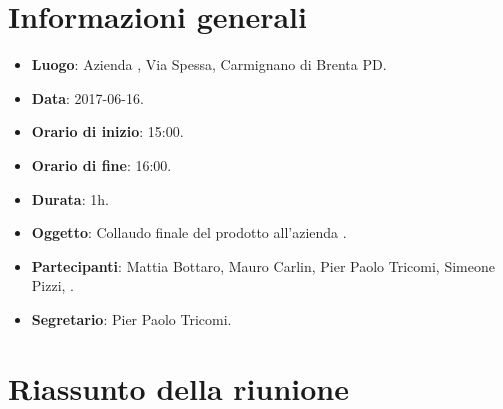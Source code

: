 \documentclass[a4paper,titlepage]{article}
\begin{document}
		
		\maketitle
		\begin{diario}
		\end{diario}
		\newpage
		\tableofcontents
		
		\newpage
		\section{Informazioni generali}
		\label{sec:Informazioni}
		
		\begin{itemize}
			\item \textbf{Luogo}: Azienda \PROPONENTE, Via Spessa, Carmignano di Brenta PD.
			\item \textbf{Data}: 2017-06-16.
			\item \textbf{Orario di inizio}: 15:00.
			\item \textbf{Orario di fine}: 16:00.
			\item \textbf{Durata}: 1h.
			\item \textbf{Oggetto}: Collaudo finale del prodotto \PROGETTO{} all'azienda \PROPONENTE.
			\item \textbf{Partecipanti}: Mattia Bottaro, Mauro Carlin, Pier Paolo Tricomi, Simeone Pizzi, \PROPONENTE.
			\item \textbf{Segretario}: Pier Paolo Tricomi.
			
		\end{itemize}
		\section{Riassunto della riunione}
		\label{sec:RiassuntoRiunione}
\end{document}
